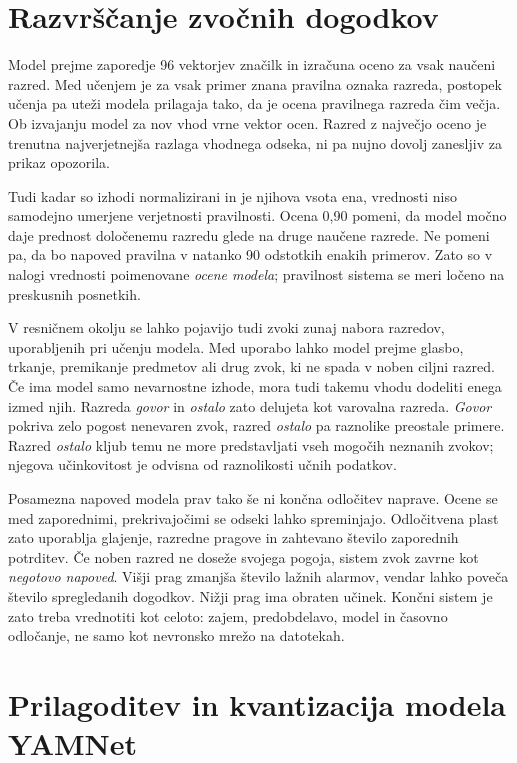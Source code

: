 \section{Razvrščanje zvočnih dogodkov}

Model prejme zaporedje 96 vektorjev značilk in izračuna oceno za vsak naučeni
razred. Med učenjem je za vsak primer znana pravilna oznaka razreda, postopek
učenja pa uteži modela prilagaja tako, da je ocena pravilnega razreda čim večja.
Ob izvajanju model za nov vhod vrne vektor ocen. Razred z največjo oceno je
trenutna najverjetnejša razlaga vhodnega odseka, ni pa nujno dovolj zanesljiv za
prikaz opozorila.

Tudi kadar so izhodi normalizirani in je njihova vsota ena, vrednosti niso
samodejno umerjene verjetnosti pravilnosti. Ocena 0,90 pomeni, da model močno
daje prednost določenemu razredu glede na druge naučene razrede. Ne pomeni pa,
da bo napoved pravilna v natanko 90 odstotkih enakih primerov. Zato so v nalogi
vrednosti poimenovane \emph{ocene modela}; pravilnost sistema se meri ločeno na
preskusnih posnetkih.

V resničnem okolju se lahko pojavijo tudi zvoki zunaj nabora razredov,
uporabljenih pri učenju modela. Med uporabo lahko model prejme glasbo, trkanje,
premikanje predmetov ali drug zvok, ki ne spada v noben ciljni razred. Če ima
model samo nevarnostne izhode, mora tudi
takemu vhodu dodeliti enega izmed njih. Razreda \emph{govor} in \emph{ostalo} zato delujeta kot
varovalna razreda. \emph{Govor} pokriva zelo pogost nenevaren zvok, razred \emph{ostalo} pa
raznolike preostale primere. Razred \emph{ostalo} kljub temu ne more predstavljati
vseh mogočih neznanih zvokov; njegova učinkovitost je odvisna od raznolikosti
učnih podatkov.

Posamezna napoved modela prav tako še ni končna odločitev naprave. Ocene se
med zaporednimi, prekrivajočimi se odseki lahko spreminjajo. Odločitvena plast
zato uporablja glajenje, razredne pragove in zahtevano število zaporednih
potrditev. Če noben razred ne doseže svojega pogoja, sistem zvok zavrne kot
\emph{negotovo napoved}. Višji prag zmanjša število lažnih alarmov, vendar lahko poveča število
spregledanih dogodkov. Nižji prag ima obraten učinek. Končni sistem je zato
treba vrednotiti kot celoto: zajem, predobdelavo, model in časovno odločanje,
ne samo kot nevronsko mrežo na datotekah.

\section{Prilagoditev in kvantizacija modela YAMNet}


